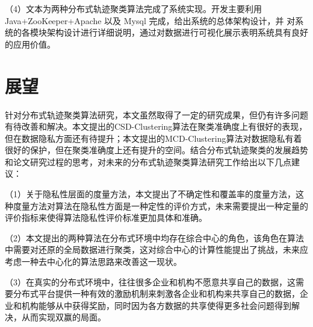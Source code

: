 （4）文本为两种分布式轨迹聚类算法完成了系统实现。开发主要利用 Java+ZooKeeper+Apache 以及 Mysql 完成，给出系统的总体架构设计，并 对系统的各模块架构设计进行详细说明，通过对数据进行可视化展示表明系统具有良好的应用价值。

\section{展望}

针对分布式轨迹聚类算法研究，本文虽然取得了一定的研究成果，但仍有许多问题有待改善和解决。本文提出的CSD-Clustering算法在聚类准确度上有很好的表现，但在数据隐私方面还有待提升；本文提出的MCD-Clustering算法对数据隐私有着很好的保护，但在聚类准确度上还有提升的空间。结合分布式轨迹聚类的发展趋势和论文研究过程的思考，对未来的分布式轨迹聚类算法研究工作给出以下几点建议：

（1）关于隐私性层面的度量方法，本文提出了不确定性和覆盖率的度量方法，这种度量方法对算法在隐私性方面是一种定性的评价方式，未来需要提出一种定量的评价指标来使得算法隐私性评价标准更加具体和准确。

（2）本文提出的两种算法在分布式环境中均存在综合中心的角色，该角色在算法中需要对还原的全局数据进行聚类，这对综合中心的计算性能提出了挑战，未来应考虑一种去中心化的算法思路来改善这一现状。

（3）在真实的分布式环境中，往往很多企业和机构不愿意共享自己的数据，这需要分布式平台提供一种有效的激励机制来刺激各企业和机构来共享自己的数据，企业和机构能够从中获得奖励，同时因为各方数据的共享使得更多社会问题得到解决，从而实现双赢的局面。


